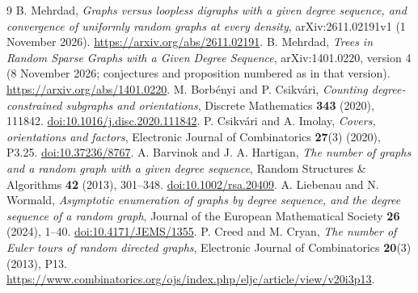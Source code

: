 \documentclass[11pt]{article}
\theoremstyle{remark}\newtheorem{remark}[theorem]{Remark}
\begin{document}
\begin{thebibliography}{9}
 B. Mehrdad, \emph{Graphs versus loopless digraphs with a given degree sequence, and convergence of uniformly random graphs at every density}, arXiv:2611.02191v1 (1 November 2026). \url{https://arxiv.org/abs/2611.02191}.
 B. Mehrdad, \emph{Trees in Random Sparse Graphs with a Given Degree Sequence}, arXiv:1401.0220, version 4 (8 November 2026; conjectures and proposition numbered as in that version). \url{https://arxiv.org/abs/1401.0220}.
 M. Borb\'enyi and P. Csikv\'ari, \emph{Counting degree-constrained subgraphs and orientations}, Discrete Mathematics \textbf{343} (2020), 111842. \href{https://doi.org/10.1016/j.disc.2020.111842}{doi:10.1016/j.disc.2020.111842}.
 P. Csikv\'ari and A. Imolay, \emph{Covers, orientations and factors}, Electronic Journal of Combinatorics \textbf{27}(3) (2020), P3.25. \href{https://doi.org/10.37236/8767}{doi:10.37236/8767}.
 A. Barvinok and J. A. Hartigan, \emph{The number of graphs and a random graph with a given degree sequence}, Random Structures \& Algorithms \textbf{42} (2013), 301--348. \href{https://doi.org/10.1002/rsa.20409}{doi:10.1002/rsa.20409}.
 A. Liebenau and N. Wormald, \emph{Asymptotic enumeration of graphs by degree sequence, and the degree sequence of a random graph}, Journal of the European Mathematical Society \textbf{26} (2024), 1--40. \href{https://doi.org/10.4171/JEMS/1355}{doi:10.4171/JEMS/1355}.
 P. Creed and M. Cryan, \emph{The number of Euler tours of random directed graphs}, Electronic Journal of Combinatorics \textbf{20}(3) (2013), P13. \url{https://www.combinatorics.org/ojs/index.php/eljc/article/view/v20i3p13}.
\end{thebibliography}
\end{document}

